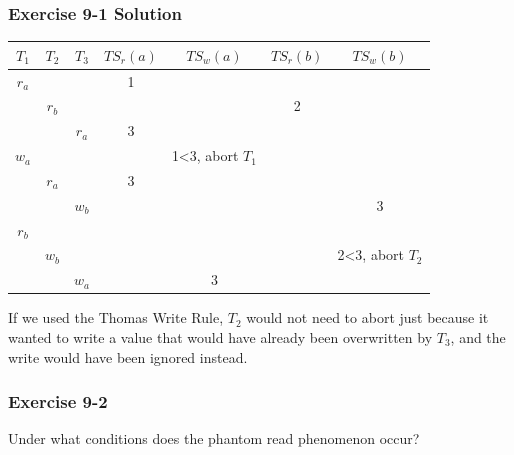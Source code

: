 \begin{frame}
\frametitle{Exercise 9-1 Solution}


\begin{center}
\begin{tabular}{ | c c c || c c c c | }
  \hline
  $T_1$ & $T_2$ & $T_3$ & $TS_r(a)$ & $TS_w(a)$ & $TS_r(b)$ & $TS_w(b)$ \\
  \hline
  $r_a$ &       &       & 1         &           &           &           \\
        & $r_b$ &       &           &           & 2         &           \\
        &       & $r_a$ & 3         &           &           &           \\
  $w_a$ &       &       &           & 1<3, abort $T_1$ &    &           \\
        & $r_a$ &       & 3         &           &           &           \\
        &       & $w_b$ &           &           &           & 3         \\
  $r_b$ &       &       &           &           &           &           \\
        & $w_b$ &       &           &           &           & 2<3, abort $T_2$ \\
        &       & $w_a$ &           & 3         &           &           \\
  \hline
\end{tabular}
\end{center}

If we used the Thomas Write Rule, $T_2$ would not need to abort just because it wanted to write a value that would have already been overwritten by $T_3$, and the write would have been ignored instead.

\end{frame}


\begin{frame}
\frametitle{Exercise 9-2}

Under what conditions does the phantom read phenomenon occur?

\end{frame}



